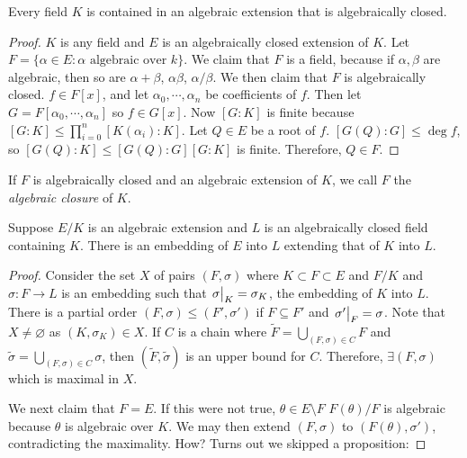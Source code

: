 \documentclass[a4paper,twoside,master.tex]{subfiles}
\begin{document}
\begin{theorem}
    Every field $ K $ is contained in an algebraic extension that is algebraically closed.
\end{theorem}
\begin{proof}
    $ K $ is any field and $ E $ is an algebraically closed extension of $ K $. Let $ F = \{\alpha \in E\colon \alpha \text{ algebraic over } k\} $. We claim that $ F $ is a field, because if $ \alpha, \beta $ are algebraic, then so are $ \alpha + \beta $, $ \alpha \beta $, $ \alpha / \beta $. We then claim that $ F $ is algebraically closed. $ f \in F[x] $, and let $ \alpha_0, \cdots, \alpha_n $ be coefficients of $ f $. Then let $ G = F[\alpha_0, \cdots, \alpha_n] $ so $ f \in G[x] $. Now $ [G\colon K] $ is finite because $ [G\colon K] \leq \prod_{i = 0}^{n} [K(\alpha_i)\colon K] $. Let $ Q \in E $ be a root of $ f $. $ [G(Q)\colon G] \leq \deg f $, so $ [G(Q)\colon K] \leq [G(Q)\colon G] [G\colon K] $ is finite. Therefore, $ Q \in F $.
\end{proof}

\begin{definition}
    If $ F $ is algebraically closed and an algebraic extension of $ K $, we call $ F $ the \textit{algebraic closure} of $ K $.
\end{definition}

\begin{claim}
    Suppose $ E/K $ is an algebraic extension and $ L $ is an algebraically closed field containing $ K $. There is an embedding of $ E $ into $ L $ extending that of $ K $ into $ L $.
\end{claim}
\begin{proof}
    Consider the set $ X $ of pairs $ (F, \sigma) $ where $ K\subset F\subset E $ and $ F/K $ and $ \sigma\colon F \to L $ is an embedding such that $ \eval{\sigma}_{K} = \sigma_K $, the embedding of $ K $ into $ L $. There is a partial order $ (F, \sigma) \leq (F', \sigma') $ if $ F\subseteq F' $ and $ \eval{\sigma'}_{F} = \sigma $. Note that $ X \neq \varnothing $ as $ (K, \sigma_K) \in X $. If $ C $ is a chain where $ \tilde{F} = \bigcup_{(F, \sigma) \in C} F $ and $ \tilde{\sigma} = \bigcup_{(F, \sigma) \in C} \sigma $, then $ (\tilde{F}, \tilde{\sigma}) $ is an upper bound for $ C $. Therefore, $ \exists (F, \sigma) $ which is maximal in $ X $.

    We next claim that $ F = E $. If this were not true, $ \theta \in E \setminus F $ $ F(\theta) / F $ is algebraic because $ \theta $ is algebraic over $ K $. We may then extend $ (F, \sigma) $ to $ (F(\theta), \sigma') $, contradicting the maximality. How? Turns out we skipped a proposition:
\end{proof}
\end{document}
